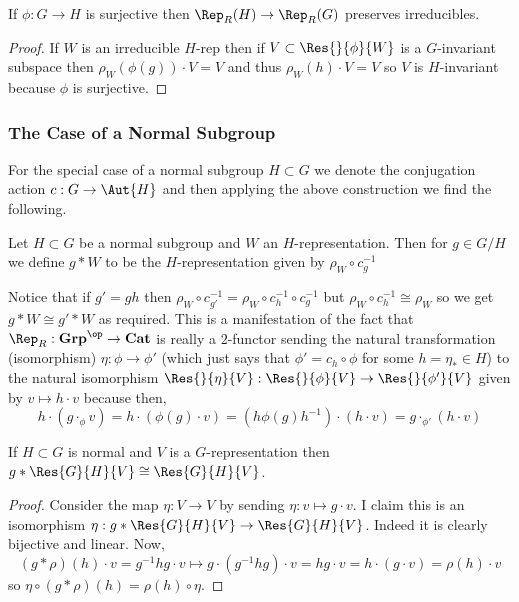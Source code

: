 \documentclass[12pt]{article}
\begin{document}
\begin{prop}
If $\phi : G \to H$ is surjective then $\Rep_R(H) \to \Rep_R(G)$ preserves irreducibles.
\end{prop}

\begin{proof}
If $W$ is an irreducible $H$-rep then if $V \subset \Res{}{\phi}{W}$ is a $G$-invariant subspace then $\rho_W(\phi(g)) \cdot V = V$ and thus $\rho_W(h) \cdot V = V$ so $V$ is $H$-invariant because $\phi$ is surjective.
\end{proof}

\subsubsection{The Case of a Normal Subgroup}

\begin{rmk}
For the special case of a normal subgroup $H \subset G$ we denote the conjugation action $c : G \to \Aut{H}$ and then applying the above construction we find the following.
\end{rmk}

\begin{defn}
Let $H \subset G$ be a normal subgroup and $W$ an $H$-representation. Then for $g \in G / H$ we define $g * W$ to be the $H$-representation given by $\rho_W \circ c_g^{-1}$ 
\end{defn}

\begin{rmk}
Notice that if $g' = g h$ then $\rho_W \circ c_{g'}^{-1} = \rho_W \circ c_h^{-1} \circ c_g^{-1}$ but $\rho_W \circ c_h^{-1} \cong \rho_W$ so we get $g * W \cong g' * W$ as required. This is a manifestation of the fact that $\Rep_R : \mathbf{Grp}^\op \to \mathbf{Cat}$ is really a $2$-functor sending the natural transformation (isomorphism) $\eta : \phi \to \phi'$ (which just says that $\phi' = c_h \circ \phi$ for some $h = \eta_* \in H$) to the natural isomorphism $\Res{}{\eta}{V} : \Res{}{\phi}{V} \to \Res{}{\phi'}{V}$ given by $v \mapsto h \cdot v$ because then,
\[ h \cdot (g \cdot_{\phi} v) = h \cdot (\phi(g) \cdot v) = (h \phi(g) h^{-1}) \cdot (h \cdot v) = g \cdot_{\phi'} (h \cdot v) \]
\end{rmk}

\begin{prop}
If $H \subset G$ is normal and $V$ is a $G$-representation then $g * \Res{G}{H}{V} \cong \Res{G}{H}{V}$.
\end{prop}

\begin{proof}
Consider the map $\eta : V \to V$ by sending $\eta: v \mapsto g \cdot v$. I claim this is an isomorphism $\eta : g * \Res{G}{H}{V} \to \Res{G}{H}{V}$. Indeed it is clearly bijective and linear. Now,
\[ (g * \rho)(h) \cdot v = g^{-1} h g \cdot v \mapsto g \cdot (g^{-1} h g) \cdot v = hg \cdot v = h \cdot (g \cdot v) = \rho(h) \cdot v \]
so $\eta \circ (g * \rho)(h) = \rho(h) \circ \eta$. 
\end{proof}
\end{document}

